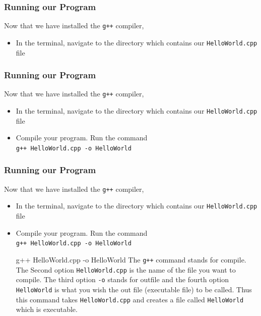 \documentclass{if-beamer}
\begin{document}
\begin{frame}
\frametitle{Running our Program}
Now that we have installed the \texttt{g++} compiler, 
\begin{itemize}
\item In the terminal, navigate to the directory which contains our \texttt{HelloWorld.cpp} file
\end{itemize} 

\end{frame}

\begin{frame}
\frametitle{Running our Program}
Now that we have installed the \texttt{g++} compiler, 
\begin{itemize}
	\item In the terminal, navigate to the directory which contains our \texttt{HelloWorld.cpp} file
	\item Compile your program. Run the command \\
	\qquad \texttt{g++ HelloWorld.cpp -o HelloWorld}
\end{itemize} 
\end{frame}

\begin{frame}
\frametitle{Running our Program}
Now that we have installed the \texttt{g++} compiler, 
\begin{itemize}
	\item In the terminal, navigate to the directory which contains our \texttt{HelloWorld.cpp} file
	\item Compile your program. Run the command \\
	\qquad \texttt{g++ HelloWorld.cpp -o HelloWorld}
	\begin{block}{g++ HelloWorld.cpp -o HelloWorld}
		The \texttt{g++} command stands for compile. The Second option \texttt{HelloWorld.cpp} is the name of the file you want to compile. The third option \texttt{-o} stands for outfile and the fourth option  \texttt{HelloWorld} is what you wish the out file (executable file) to be called. Thus this command takes \texttt{HelloWorld.cpp} and creates a file called \texttt{HelloWorld} which is executable. 
	\end{block}
\end{itemize} 
\end{frame}
\end{document}
